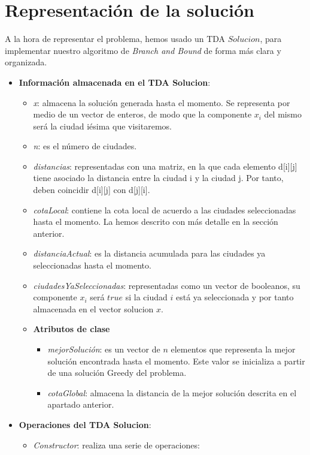 \documentclass{article}
\begin{document}
	\section{Representación de la solución}
	A la hora de representar el problema, hemos usado un TDA $Solucion$, para implementar nuestro algoritmo de \textit{Branch and Bound} de forma más clara y organizada.
	\begin{itemize}
		\item \textbf{Información almacenada en el TDA Solucion}:
		\begin{itemize}
			\item \textit {x}: almacena la solución generada hasta el momento. Se representa por medio de un vector de enteros, de modo que la componente $x_i$ del mismo será la ciudad iésima que visitaremos. 
			\item \textit {n}: es el número de ciudades.
			\item \textit{distancias}: representadas con una matriz, en la que cada elemento d[i][j] tiene asociado la distancia entre la ciudad i y la ciudad j. Por tanto, deben coincidir d[i][j] con d[j][i].
			\item \textit {cotaLocal}: contiene la cota local de acuerdo a las ciudades seleccionadas hasta el momento. La hemos descrito con más detalle en la sección anterior.
			\item \textit {distanciaActual}: es la distancia acumulada para las ciudades ya seleccionadas hasta el momento. 
			\item \textit {ciudadesYaSeleccionadas}: representadas como un vector de booleanos, su componente $x_i$ será $true$ si la ciudad $i$ está ya seleccionada y por tanto almacenada en el vector solucion $x$.
			\item \textbf{Atributos de clase}
			\begin{itemize} 
			\item \textit {mejorSolución}: es un vector de $n$ elementos que representa la mejor solución encontrada hasta el momento. Este valor se inicializa a partir de una solución Greedy del problema.
			\item \textit {cotaGlobal}: almacena la distancia de la mejor solución descrita en el apartado anterior.
			\end{itemize}
		\end{itemize}
		\item \textbf{Operaciones del TDA Solucion}:
		\begin{itemize}
			\item \textit {Constructor}: realiza una serie de operaciones:

\end{itemize}
\end{itemize}
\end{document}
